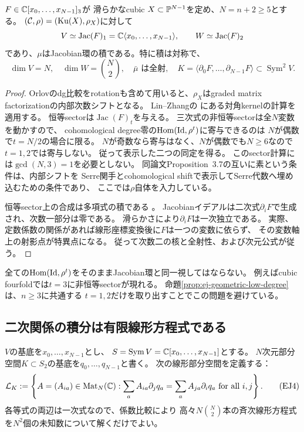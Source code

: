 \begin{proposition}[可換cubicにおける低次数の同定]
\label{prop:ej-geometric-low-degree}
$F\in\mathbb C[x_0,\ldots,x_{N-1}]_3$が
滑らかなcubic $X\subset\mathbb P^{N-1}$を定め、$N=n+2\ge5$とする。
$(\mathcal C,\rho)=(\operatorname{Ku}(X),\rho_X)$に対して
\[
 V\simeq\operatorname{Jac}(F)_1=\mathbb C\langle x_0,\ldots,x_{N-1}\rangle,
 \qquad W\simeq\operatorname{Jac}(F)_2
\]
であり、$\mu$はJacobian環の積である。特に積は対称で、
\[
 \dim V=N,\quad \dim W=\binom N2,\quad
 \bar\mu\text{ は全射},\quad
 K=\langle\partial_0F,\ldots,\partial_{N-1}F\rangle
 \subset\operatorname{Sym}^2V.
 \tag{EJ3}\label{eq:ej-jacobian-kernel}
\]
\end{proposition}
\begin{proof}
Orlovのdg比較をrotationも含めて用いると、$\rho_X$はgraded matrix
factorizationの内部次数シフトとなる。
Lin--Zhangの\cite[Theorem~2.2, Theorem~3.5, Remark~3.6, Section~5]{LZ}
にある対角kernelの計算を適用する。
恒等sectorは$\operatorname{Jac}(F)_t$を与える。
三次式の非恒等sectorは全$N$変数を動かすので、
cohomological degree零の$\operatorname{Hom}(\operatorname{Id},\rho^t)$に寄与できるのは
$N$が偶数で$t=N/2$の場合に限る。
$N$が奇数なら寄与はなく、$N$が偶数でも$N\ge6$なので$t=1,2$では寄与しない。
従って表示した二つの同定を得る。
このsector計算には$\gcd(N,3)=1$を必要としない。
同論文Proposition~3.7の互いに素という条件は、内部シフトを
Serre関手とcohomological shiftで表示してSerre代数へ埋め込むための条件であり、
ここでは$\rho$自体を入力している。

恒等sector上の合成は多項式の積である
\cite[Remark~3.6]{LZ}。
Jacobianイデアルは二次式$\partial_iF$で生成され、次数一部分は零である。
滑らかさにより$\partial_iF$は一次独立である。
実際、定数係数の関係があれば線形座標変換後に$F$は一つの変数に依らず、
その変数軸上の射影点が特異点になる。
従って次数二の核と全射性、および次元公式が従う。
\end{proof}

\begin{remark}[低次数だけを使う理由]
全ての$\operatorname{Hom}(\operatorname{Id},\rho^t)$をそのままJacobian環と同一視してはならない。
例えばcubic fourfoldでは$t=3$に非恒等sectorが現れる。
命題\ref{prop:ej-geometric-low-degree}は、$n\ge3$に共通する
$t=1,2$だけを取り出すことでこの問題を避けている。
\end{remark}

\subsection{二次関係の積分は有限線形方程式である}

$V$の基底を$x_0,\ldots,x_{N-1}$とし、
$S=\operatorname{Sym}V=\mathbb C[x_0,\ldots,x_{N-1}]$とする。
$N$次元部分空間$K\subset S_2$の基底を$q_0,\ldots,q_{N-1}$と書く。
次の線形部分空間を定義する：
\[
 \mathcal L_K:=\left\{A=(A_{ia})\in\operatorname{Mat}_N(\mathbb C):
 \sum_a A_{ia}\partial_jq_a=\sum_a A_{ja}\partial_iq_a
 \text{ for all }i,j\right\}.
 \tag{EJ4}\label{eq:ej-integrability}
\]
各等式の両辺は一次式なので、係数比較により
高々$N\binom N2$本の斉次線形方程式を$N^2$個の未知数について解くだけでよい。

